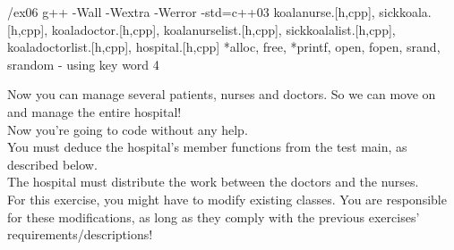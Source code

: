\newpage

\printCPPExerciseFormalities
{/ex06}
{g++ -Wall -Wextra -Werror -std=c++03}
{koalanurse.[h,cpp], sickkoala.[h,cpp], koaladoctor.[h,cpp], koalanurselist.[h,cpp],
sickkoalalist.[h,cpp], koaladoctorlist.[h,cpp], hospital.[h,cpp]}
{*alloc, free, *printf, open, fopen, srand, srandom - using key word}
{4}

Now you can manage several patients, nurses and doctors. So we can move on and
manage the entire hospital!\\

Now you're going to code without any help.\\

You must deduce the hospital's member functions from the test main, as described below.\\

The hospital must distribute the work between the doctors and the nurses.\\

For this exercise, you might have to modify existing classes. You are responsible for
these modifications, as long as they comply with the previous exercises'
requirements/descriptions!\\

